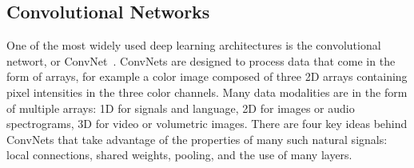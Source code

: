 \documentclass[10pts]{article}
\begin{document}

\vspace{-0.12cm}
\subsection*{Convolutional Networks}
\vspace{-0.12cm}

One of the most widely used deep learning architectures is the
convolutional networt, or ConvNet~\cite{lecun-90c,lecun-98}. ConvNets
are designed to process data that come in the form of arrays, for
example a color image composed of three 2D arrays containing pixel
intensities in the three color channels. Many data modalities are in
the form of multiple arrays: 1D for signals and language, 2D for
images or audio spectrograms, 3D for video or volumetric images.
There are four key ideas behind ConvNets that take advantage of the
properties of many such natural signals: local connections, shared
weights, pooling, and the use of many layers.
\end{document}
